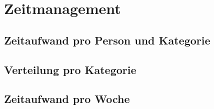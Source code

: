 \section{Zeitmanagement}

\subsection{Zeitaufwand pro Person und Kategorie}


\subsection{Verteilung pro Kategorie}


\subsection{Zeitaufwand pro Woche}
